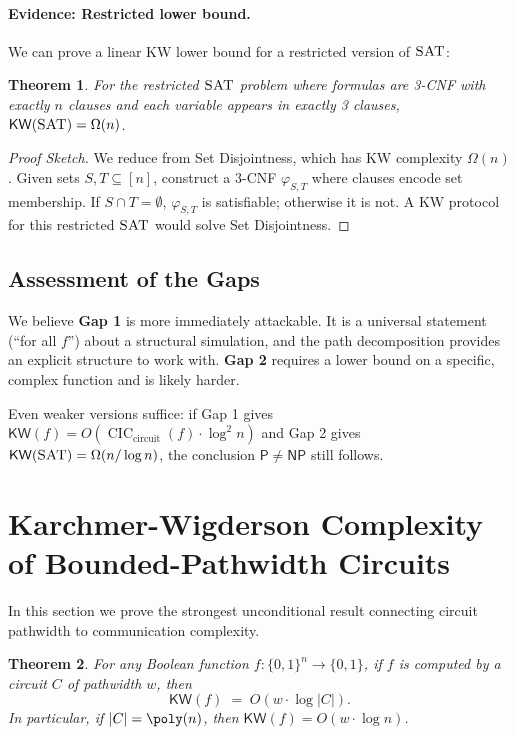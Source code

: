 \documentclass[11pt]{article}
\theoremstyle{plain}
\newtheorem{theorem}{Theorem}[section]
\theoremstyle{definition}
\newcommand{\CIC}{\operatorname{CIC}}
\newcommand{\CICcirc}{\CIC_{\text{circuit}}}
\newcommand{\SAT}{\textsc{SAT}}
\newcommand{\KW}{\mathsf{KW}}
\newcommand{\Pclass}{\mathsf{P}}
\newcommand{\NP}{\mathsf{NP}}
\newcommand{\set}[1]{\{#1\}}
\begin{document}
\paragraph{Evidence: Restricted lower bound.} We can prove a linear KW lower bound for a restricted version of $\SAT$:

\begin{theorem}\label{thm:kw-restricted}
For the restricted $\SAT$ problem where formulas are 3-CNF with exactly $n$ clauses and each variable appears in exactly 3 clauses, $\KW(\SAT) = \Omega(n)$.
\end{theorem}

\begin{proof}[Proof Sketch]
We reduce from Set Disjointness, which has KW complexity $\Omega(n)$. Given sets $S, T \subseteq [n]$, construct a 3-CNF $\varphi_{S,T}$ where clauses encode set membership. If $S \cap T = \emptyset$, $\varphi_{S,T}$ is satisfiable; otherwise it is not. A KW protocol for this restricted $\SAT$ would solve Set Disjointness.
\end{proof}

\subsection{Assessment of the Gaps}

We believe \textbf{Gap 1} is more immediately attackable. It is a universal statement (``for all $f$'') about a structural simulation, and the path decomposition provides an explicit structure to work with. \textbf{Gap 2} requires a lower bound on a specific, complex function and is likely harder.

Even weaker versions suffice: if Gap 1 gives $\KW(f) = O(\CICcirc(f) \cdot \log^2 n)$ and Gap 2 gives $\KW(\SAT) = \Omega(n / \log n)$, the conclusion $\Pclass \neq \NP$ still follows.


\section{Karchmer-Wigderson Complexity of Bounded-Pathwidth Circuits}\label{sec:kw}

In this section we prove the strongest unconditional result connecting circuit pathwidth to communication complexity.

\begin{theorem}\label{thm:kw-bound}
For any Boolean function $f : \set{0,1}^n \to \set{0,1}$, if $f$ is computed by a circuit $C$ of pathwidth $w$, then
\[
\KW(f) \;=\; O(w \cdot \log |C|).
\]
In particular, if $|C| = \poly(n)$, then $\KW(f) = O(w \cdot \log n)$.
\end{theorem}
\end{document}

